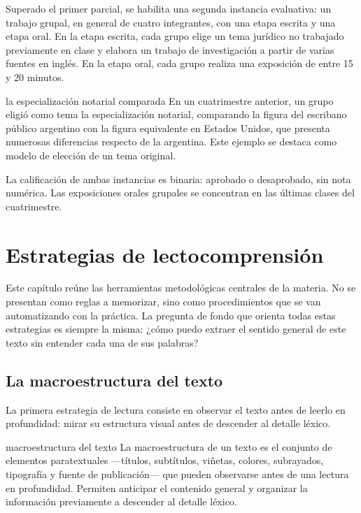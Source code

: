 \documentclass[12pt,oneside]{book}
\begin{document}
Superado el primer parcial, se habilita una segunda instancia evaluativa: un trabajo grupal, en general de cuatro integrantes, con una etapa escrita y una etapa oral. En la etapa escrita, cada grupo elige un tema jurídico no trabajado previamente en clase y elabora un trabajo de investigación a partir de varias fuentes en inglés. En la etapa oral, cada grupo realiza una exposición de entre 15 y 20 minutos.

\begin{example}{la especialización notarial comparada}
En un cuatrimestre anterior, un grupo eligió como tema la especialización notarial, comparando la figura del escribano público argentino con la figura equivalente en Estados Unidos, que presenta numerosas diferencias respecto de la argentina. Este ejemplo se destaca como modelo de elección de un tema original.
\end{example}

La calificación de ambas instancias es binaria: aprobado o desaprobado, sin nota numérica. Las exposiciones orales grupales se concentran en las últimas clases del cuatrimestre.

\chapter{Estrategias de lectocomprensión}
\label{cap:estrategias}

Este capítulo reúne las herramientas metodológicas centrales de la materia. No se presentan como reglas a memorizar, sino como procedimientos que se van automatizando con la práctica. La pregunta de fondo que orienta todas estas estrategias es siempre la misma: ¿cómo puedo extraer el sentido general de este texto sin entender cada una de sus palabras?

\section{La macroestructura del texto}
\label{sec:macroestructura}

La primera estrategia de lectura consiste en observar el texto antes de leerlo en profundidad: mirar su estructura visual antes de descender al detalle léxico.

\begin{definition}{macroestructura del texto}
La macroestructura de un texto es el conjunto de elementos paratextuales ---títulos, subtítulos, viñetas, colores, subrayados, tipografía y fuente de publicación--- que pueden observarse antes de una lectura en profundidad. Permiten anticipar el contenido general y organizar la información previamente a descender al detalle léxico.
\end{definition}
\end{document}
